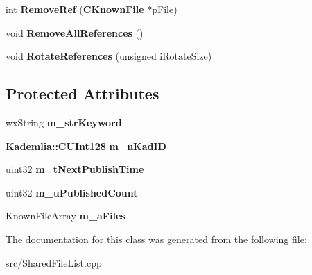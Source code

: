 \begin{DoxyCompactItemize}
\item 
int {\bfseries RemoveRef} ({\bf CKnownFile} $\ast$pFile)\label{classCPublishKeyword_a51ff0f52f576b33c1ebe945ba9529424}

\item 
void {\bfseries RemoveAllReferences} ()\label{classCPublishKeyword_a54edaad49dc0f2d480db320c45be201b}

\item 
void {\bfseries RotateReferences} (unsigned iRotateSize)\label{classCPublishKeyword_ac8a8a7e0d8f8a1c4882768cfebdd9bba}

\end{DoxyCompactItemize}
\subsection*{Protected Attributes}
\begin{DoxyCompactItemize}
\item 
wxString {\bfseries m\_\-strKeyword}\label{classCPublishKeyword_ad5a2eee01f72985535c8be95d08652d2}

\item 
{\bf Kademlia::CUInt128} {\bfseries m\_\-nKadID}\label{classCPublishKeyword_a097fde16266f6a3f7da5c545414eaef4}

\item 
uint32 {\bfseries m\_\-tNextPublishTime}\label{classCPublishKeyword_a9e2af73a0767807853da164532db4416}

\item 
uint32 {\bfseries m\_\-uPublishedCount}\label{classCPublishKeyword_a7356ee575bae371324f76ccf85a546aa}

\item 
KnownFileArray {\bfseries m\_\-aFiles}\label{classCPublishKeyword_a7f7e62f338731157ba5350de6fe91860}

\end{DoxyCompactItemize}


The documentation for this class was generated from the following file:\begin{DoxyCompactItemize}
\item 
src/SharedFileList.cpp\end{DoxyCompactItemize}
